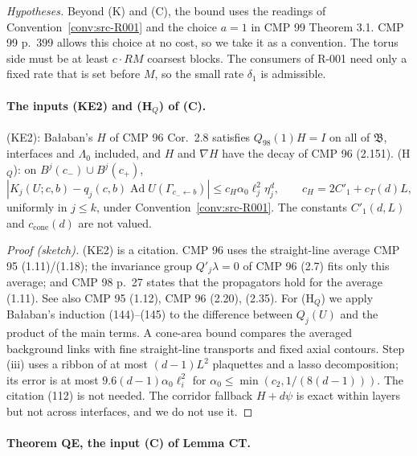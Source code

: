 \emph{Hypotheses.} Beyond (K) and (C), the bound uses the readings of Convention~\ref{conv:src-R001} and the choice $a=1$ in CMP 99 Theorem 3.1. CMP 99 p.~399 allows this choice at no cost, so we take it as a convention. The torus side must be at least $c\cdot RM$ coarsest blocks. The consumers of R-001 need only a fixed rate that is set before $M$, so the small rate $\delta_1$ is admissible.

\paragraph{The inputs (KE2) and (H$_Q$) of (C).}

\begin{proposition}[(KE2) (H-136) and (H$_Q$) (H-123)]\label{src:QE-KE-HQ}
(KE2): Ba{\l}aban's $H$ of CMP 96 Cor.\ 2.8 satisfies $Q_{98}(1)H=I$ on all of $\mathfrak B$, interfaces and $\Lambda_0$ included, and $H$ and $\nabla H$ have the decay of CMP 96 (2.151). (H$_Q$): on $B^j(c_-)\cup B^j(c_+)$,
\[
|K_j(U;c,b)-q_j(c,b)\operatorname{Ad}U(\Gamma_{c_-\leftarrow b})|\le c_H\alpha_0\ell_j^2\eta_j^d,\qquad c_H=2C'_1+c_T(d)L,
\]
uniformly in $j\le k$, under Convention~\ref{conv:src-R001}. The constants $C'_1(d,L)$ and $c_{\mathrm{cone}}(d)$ are not valued.
\end{proposition}
\begin{proof}[Proof (sketch)]
(KE2) is a citation. CMP 96 uses the straight-line average CMP 95 (1.11)/(1.18); the invariance group $Q'_j\lambda=0$ of CMP 96 (2.7) fits only this average; and CMP 98 p.~27 states that the propagators hold for the average (1.11). See also CMP 95 (1.12), CMP 96 (2.20), (2.35).
For (H$_Q$) we apply Ba{\l}aban's induction (144)--(145) to the difference between $Q_j(U)$ and the product of the main terms. A cone-area bound compares the averaged background links with fine straight-line transports and fixed axial contours. Step (iii) uses a ribbon of at most $(d-1)L^2$ plaquettes and a lasso decomposition; its error is at most $9.6(d-1)\alpha_0\ell_i^2$ for $\alpha_0\le\min(c_2,1/(8(d-1)))$. The citation (112) is not needed. The corridor fallback $H+d\psi$ is exact within layers but not across interfaces, and we do not use it.
\end{proof}

\paragraph{Theorem QE, the input (C) of Lemma CT.}

